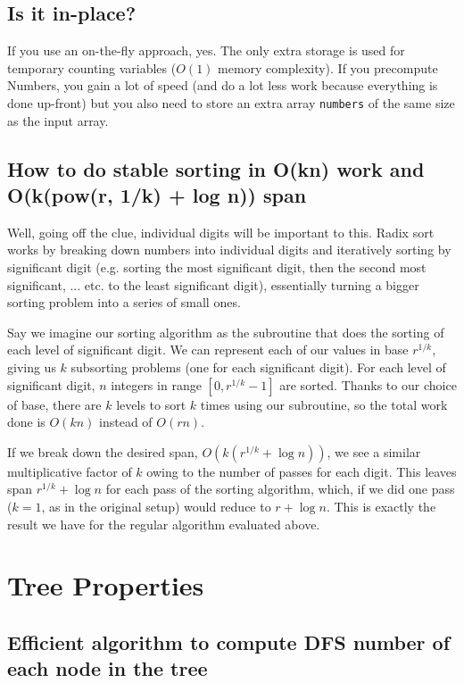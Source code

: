 \documentclass[11pt]{article}
\theoremstyle{definition}
\begin{document}
\subsection{Is it in-place?}

If you use an on-the-fly approach, yes. The only extra storage is used for temporary counting variables ($O(1)$ memory complexity). If you precompute Numbers, you gain a lot of speed (and do a lot less work because everything is done up-front) but you also need to store an extra array \texttt{numbers} of the same size as the input array.

\subsection{How to do stable sorting in O(kn) work and O(k(pow(r, 1/k) + log n)) span}

Well, going off the clue, individual digits will be important to this. Radix sort works by breaking down numbers into individual digits and iteratively sorting by significant digit (e.g. sorting the most significant digit, then the second most significant, ... etc. to the least significant digit), essentially turning a bigger sorting problem into a series of small ones.

Say we imagine our sorting algorithm as the subroutine that does the sorting of each level of significant digit. We can represent each of our values in base $r^{1/k}$, giving us $k$ subsorting problems (one for each significant digit). For each level of significant digit, $n$ integers in range $[0, r^{1/k} -1]$ are sorted. Thanks to our choice of base, there are $k$ levels to sort $k$ times using our subroutine, so the total work done is $O(kn)$ instead of $O(rn)$.

If we break down the desired span, $O(k(r^{1/k} + \log n))$, we see a similar multiplicative factor of $k$ owing to the number of passes for each digit. This leaves span $r^{1/k} + \log n$ for each pass of the sorting algorithm, which, if we did one pass ($k=1$, as in the original setup) would reduce to $r + \log n$. This is exactly the result we have for the regular algorithm evaluated above.

\newpage
\section{Tree Properties}

\subsection{Efficient algorithm to compute DFS number of each node in the tree}
\end{document}
